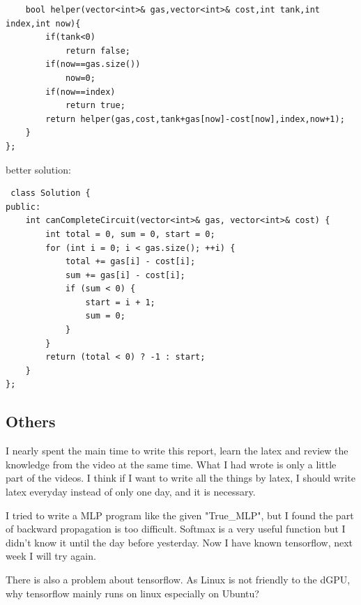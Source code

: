 \documentclass[10pt]{article}
\begin{document}
\begin{itemize}
\begin{lstlisting}
    bool helper(vector<int>& gas,vector<int>& cost,int tank,int index,int now){
        if(tank<0)
            return false;
        if(now==gas.size())
            now=0;
        if(now==index)
            return true;
        return helper(gas,cost,tank+gas[now]-cost[now],index,now+1);
    }
};
 \end{lstlisting}
 better solution:
 \begin{lstlisting}
 class Solution {
public:
    int canCompleteCircuit(vector<int>& gas, vector<int>& cost) {
        int total = 0, sum = 0, start = 0;
        for (int i = 0; i < gas.size(); ++i) {
            total += gas[i] - cost[i];
            sum += gas[i] - cost[i];
            if (sum < 0) {
                start = i + 1;
                sum = 0;
            }
        }
        return (total < 0) ? -1 : start;
    }
};
\end{lstlisting}
 \end{itemize}
 
 \begin{center}
 \section{Others}
 \end{center}
 \begin{flushleft}
  I nearly spent the main time to write this report, learn the latex and review the knowledge from the video at the same time. What I had wrote is only a little part of the videos. I think if I want to write all the things by latex, I should write latex everyday instead of only one day, and it is necessary. 
  
  I tried to write a MLP program like the given "True\_MLP", but I found the part of backward propagation is too difficult. Softmax is a very useful function but I didn't know it until the day before yesterday. Now I have known tensorflow, next week I will try again.
  
  There is also a problem about tensorflow. As Linux is not friendly to the dGPU, why tensorflow mainly runs on linux especially on Ubuntu? 
 \end{flushleft}
\end{document}
